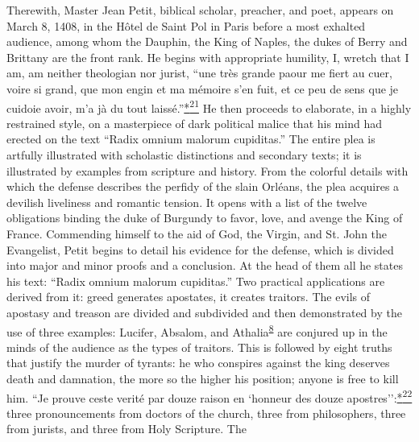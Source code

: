 Therewith, Master Jean Petit, biblical scholar, preacher, and poet,
appears on March 8, 1408, in the Hôtel de Saint Pol in Paris before a
most exhalted audience, among whom the Dauphin, the King of Naples, the
dukes of Berry and Brittany are the front rank. He begins with
appropriate humility, I, wretch that I am, am neither theologian nor
jurist, ``une très grande paour me fiert au cuer, voire si grand, que
mon engin et ma mémoire s'en fuit, et ce peu de sens que je cuidoie
avoir, m'a jà du tout
laissé.''\protect\hypertarget{18_Chapter_Eleven__THE_FORMS_OF_THO.xhtmlux5cux23id_2609}{\protect\hyperlink{23_NOTES.xhtmlux5cux23id_2610}{*\textsuperscript{21}}}
He then proceeds to elaborate, in a highly restrained style, on a
masterpiece of dark political malice that his mind had erected on the
text ``Radix omnium malorum cupiditas.'' The entire plea is artfully
illustrated with scholastic distinctions and secondary texts; it is
illustrated by examples from scripture and history. From the colorful
details with which the defense describes the perfidy of the slain
Orléans, the plea acquires a devilish liveliness and romantic tension.
It opens with a list of the twelve obligations binding the duke of
Burgundy to favor, love, and avenge the King of France. Commending
himself to the aid of God, the Virgin, and St. John
\protect\hypertarget{18_Chapter_Eleven__THE_FORMS_OF_THO.xhtmlux5cux23page_272}{}{}the
Evangelist, Petit begins to detail his evidence for the defense, which
is divided into major and minor proofs and a conclusion. At the head of
them all he states his text: ``Radix omnium malorum cupiditas.'' Two
practical applications are derived from it: greed generates apostates,
it creates traitors. The evils of apostasy and treason are divided and
subdivided and then demonstrated by the use of three examples: Lucifer,
Absalom, and
Athalia\textsuperscript{\protect\hypertarget{18_Chapter_Eleven__THE_FORMS_OF_THO.xhtmlux5cux23id_616}{\protect\hyperlink{23_NOTES.xhtmlux5cux23page_429}{8}}}
are conjured up in the minds of the audience as the types of traitors.
This is followed by eight truths that justify the murder of tyrants: he
who conspires against the king deserves death and damnation, the more so
the higher his position; anyone is free to kill him. ``Je prouve ceste
verité par douze raison en `honneur des douze
apostres'':\protect\hypertarget{18_Chapter_Eleven__THE_FORMS_OF_THO.xhtmlux5cux23id_2611}{\protect\hyperlink{23_NOTES.xhtmlux5cux23id_2612}{*\textsuperscript{22}}}
three pronouncements from doctors of the church, three from
philosophers, three from jurists, and three from Holy Scripture. The
